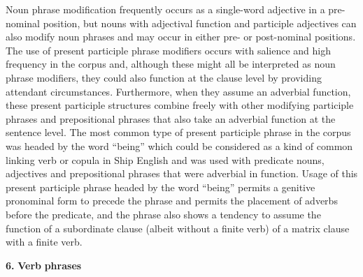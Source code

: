 Noun phrase modification frequently occurs as a single-word adjective in a pre-nominal position, but nouns with adjectival function and participle adjectives can also modify noun phrases and may occur in either pre- or post-nominal positions. The use of present participle phrase modifiers occurs with salience and high frequency in the corpus and, although these might all be interpreted as noun phrase modifiers, they could also function at the clause level by providing attendant circumstances. Furthermore, when they assume an adverbial function, these present participle structures combine freely with other modifying participle phrases and prepositional phrases that also take an adverbial function at the sentence level. The most common type of present participle phrase in the corpus was headed by the word “being” which could be considered as a kind of common linking verb or copula in Ship English and was used with predicate nouns, adjectives and prepositional phrases that were adverbial in function. Usage of this present participle phrase headed by the word “being” permits a genitive pronominal form to precede the phrase and permits the placement of adverbs before the predicate, and the phrase also shows a tendency to assume the function of a subordinate clause (albeit without a finite verb) of a matrix clause with a finite verb. 

\textbf{6.} \textbf{Verb} \textbf{phrases}

